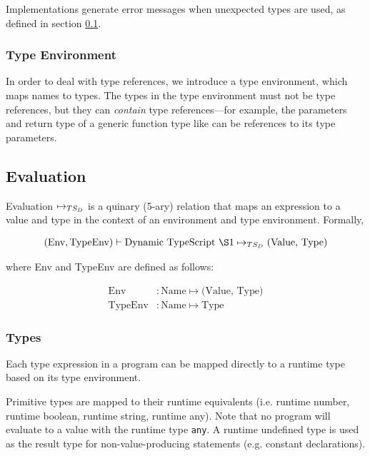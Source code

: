 Implementations generate error messages when unexpected types are used, as defined in section \ref{eval}.

\subsubsection*{Type Environment}

In order to deal with type references, we introduce a type environment, which maps names to types. 
The types in the type environment must not be type references, but they can \textit{contain} type references---for example, the parameters and return type of a generic function type like  can be references to its type parameters.


\subsection{Evaluation}
\label{eval}

Evaluation $\mapsto_{TS_D}$ is a quinary (5-ary) relation that maps an expression to a value and type in the  context of an environment and type environment.
Formally, 

\begin{align*}
    (\textrm{Env}, \textrm{TypeEnv}) \vdash \textrm{\DynamicTS{}} \Eval \textrm{(Value, Type)}
\end{align*}

where Env and TypeEnv are defined as follows:

\begin{align*}
\textrm{Env} &: \textrm{Name} \mapsto \textrm{(Value, Type)} \\
\textrm{TypeEnv} &: \textrm{Name} \mapsto \textrm{Type}
\end{align*}

\subsubsection*{Types}

Each type expression in a \DynamicTS{} program can be mapped directly to a runtime type based on its type environment.

Primitive types are mapped to their runtime equivalents (i.e. runtime number, runtime boolean, runtime string, runtime any). 
Note that no program will evaluate to a value with the runtime type \verb|any|.
A runtime undefined type is used as the result type for non-value-producing statements (e.g. constant declarations).

